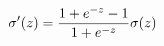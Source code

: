 \documentclass[preview]{standalone}
\begin{document}
\begin{align*}
\special{dvisvgm:raw <g id='unique000'>}\sigma^\prime(z)=\frac{1+e^{-z}-1}{1+e^{-z }}\sigma(z)\special{dvisvgm:raw </g>}
\end{align*}
\end{document}
